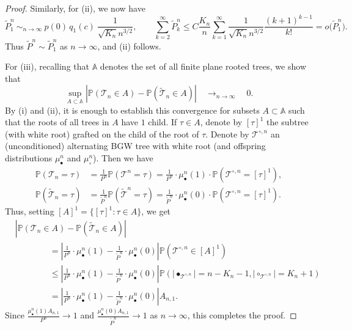 \documentclass[AHL,XML,longabstracts,Unicode]{cedram}
\providecommand{\abs}[1]{\lvert#1\rvert}
\def\mubn{\mu_{\bullet}^{n}}
\def\mucn{\mu_{\circ}^{n}}
\def\tTs{\tilde{\Ts}}
\def\Ts{\mathscr{T}}
\renewcommand\Pr[1]{\mathbb{P}\left(#1\right)}
\begin{document}
\begin{proof}
Similarly, for (ii), we now have
\[ \tilde{P}^{n}_{1}  \ \mathop{\sim}_{n \rightarrow \infty} \
{ p(0)\, q_{1}(c)}\ \frac{1}{\sqrt{K_{n}} n^{3/2}}, \qquad \sum_{k=2}^{\infty} \tilde{P}^{n}_{k} \leq C  \frac{K_{n}}{n}\sum_{k=1}^{\infty}\frac{1}{\sqrt{K_{n}} n^{3/2}}  \frac{(k+1)^{k-1}}{k!}= o\big( \tilde{P}^{n}_{1} \big).\]
Thus $\tilde{P}^{n} \sim \tilde{P}^{n}_{1}$ as $n \rightarrow \infty$, and (ii) follows.


For (iii), recalling that $\mathbb{A}$ denotes the set of all finite plane rooted trees, we show that
\begin{equation}
\label{eq:dtv}\sup_{A \subset \mathbb{A}} \left| \Pr{\Ts_{n} \in A} -  \Pr{\tilde{\Ts}_{n} \in A}\right|   \quad \mathop{\longrightarrow}_{n \rightarrow \infty} \quad  0.
\end{equation}
By (i) and (ii), it is enough to establish this convergence for subsets $A \subset \mathbb{A}$ such that the roots of all trees in $A$ have $1$ child.
If $\tau \in A$, denote by $[\tau]^{1}$ the subtree (with white root) grafted on the child of the root of $\tau$.
Denote by $\Ts^{\circ,n}$  an (unconditioned) alternating BGW tree with white root (and offspring distributions
$\mubn$ and $\mucn$). Then we have
\begin{align*}
  \Pr{ \Ts_{n}=\tau}&= \frac{1}{P^{n}} \Pr{ \Ts^{n}=\tau} = \frac{1}{P^{n}} \cdot \mubn(1) \cdot \Pr{ \Ts^{\circ,n}=[\tau]^{1}},\\
  \Pr{ \tTs_{n}=\tau}&= \frac{1}{\tilde{P}^{n}} \Pr{ \tTs^{n}=\tau} = \frac{1}{\tilde{P}^{n}} \cdot \mubn(0) \cdot \Pr{ \Ts^{\circ,n}=[\tau]^{1} }.
\end{align*}
Thus, setting $[A]^{1}= \{[\tau]^{1} : \tau \in A\}$, we get
\begin{align*}
&\left| \Pr{\Ts_{n} \in A} -  \Pr{\tilde{\Ts}_{n} \in A}\right| \\
& \qquad  \qquad = \left| \frac{1}{P^{n}} \cdot \mubn(1)- \frac{1}{\tilde{P}^{n}} \cdot \mubn(0) \right| \Pr{ \Ts^{\circ,n}  \in [A]^{1}}\\
& \qquad \qquad \leq \left| \frac{1}{P^{n}} \cdot \mubn(1)- \frac{1}{\tilde{P}^{n}} \cdot \mubn(0) \right|  \Pr{\abs{\bullet_{\Ts^{\circ,n}}}=n-K_{n}-1, \abs{\circ_{\Ts^{\circ,n}}}=K_{n}+1} \\
& \qquad \qquad = \left| \frac{1}{P^{n}} \cdot \mubn(1)- \frac{1}{\tilde{P}^{n}} \cdot \mubn(0) \right|  A_{n,1}.
\end{align*}
Since $\tfrac{\mubn(1) A_{n,1}}{P^{n}} \rightarrow 1$ and $\tfrac{\mubn(0) A_{n,1}}{\tilde{P}^{n}} \rightarrow 1$ as $n \rightarrow \infty$, this completes the proof.
\end{proof}
\end{document}
